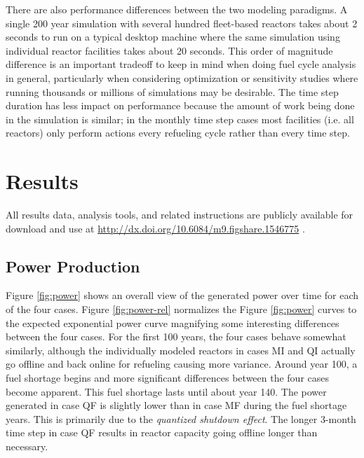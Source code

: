 \documentclass{style}
\begin{document}
There are also performance differences between the two modeling paradigms.  A
single 200 year simulation with several hundred fleet-based reactors takes
about 2 seconds to run on a typical desktop machine where the same simulation
using individual reactor facilities takes about 20 seconds.  This order of
magnitude difference is an important tradeoff to keep in mind when doing fuel
cycle analysis in general, particularly when considering optimization or
sensitivity studies where running thousands or millions of simulations may be
desirable.  The time step duration has less impact on performance because the
amount of work being done in the simulation is similar; in the monthly time
step cases most facilities (i.e. all reactors) only perform actions every
refueling cycle rather than every time step.

\section{Results}

All results data, analysis tools, and related instructions are publicly
available for download and use at
\url{http://dx.doi.org/10.6084/m9.figshare.1546775} \cite{Carlsen2015}.

\subsection{Power Production}

Figure \ref{fig:power} shows an overall view of the generated power over time
for each of the four cases.  Figure \ref{fig:power-rel} normalizes the Figure
\ref{fig:power} curves to the expected exponential power curve magnifying some
interesting differences between the four cases.  For the first 100 years, the
four cases behave somewhat similarly, although the individually modeled
reactors in cases MI and QI actually go offline and back online for refueling
causing more variance.  Around year 100, a fuel shortage begins and more
significant differences between the four cases become apparent. This fuel
shortage lasts until about year 140. The power generated in case QF is slightly
lower than in case MF during the fuel shortage years. This is primarily due to
the \emph{quantized shutdown effect}.  The longer 3-month time step in case QF 
results in reactor capacity going offline longer than necessary.
\end{document}
